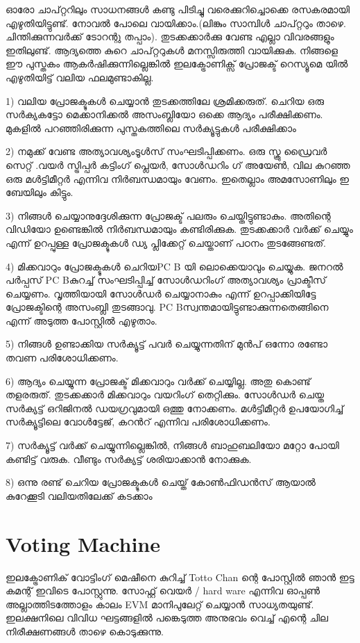 \documentclass[10pt,a4paper]{report}
\begin{document}
      ഓരോ ചാപ്റ്ററിലും സാധനങ്ങൾ കണ്ടു പിടിച്ചു വരെക്കുറിച്ചൊക്കെ രസകരമായി എഴുതിയിട്ടുണ്ട്. നോവൽ പോലെ വായിക്കാം.(ലിങ്കും സാമ്പിൾ ചാപ്റ്ററും താഴെ. ചിന്തിക്കുന്നവർക്ക് ടോറന്റു തപ്പാം). തുടക്കക്കാർക്കു വേണ്ട എല്ലാ വിവരങ്ങളും ഇതിലുണ്ട്. ആദ്യത്തെ കുറെ ചാപ്റ്ററുകൾ മനസ്സിരുത്തി വായിക്കുക. നിങ്ങളെ ഈ പുസ്തകം ആകർഷിക്കുന്നില്ലെങ്കിൽ ഇലക്ട്രോണിക്സ് പ്രോജക്ട് റെസ്യൂമെ യിൽ എഴുതിയിട്ട് വലിയ ഫലമുണ്ടാകില്ല.
      
       1) വലിയ പ്രോജക്ടുകൾ ചെയ്യാൻ തുടക്കത്തിലേ ശ്രമിക്കരുത്. ചെറിയ ഒരു സർക്യകട്ടോ മെക്കാനിക്കൽ അസംബ്ലിയോ ഒക്കെ ആദ്യം പരീക്ഷിക്കണം. മുകളിൽ പറഞ്ഞിരിക്കുന്ന പുസ്തകത്തിലെ സർക്യൂട്ടുകൾ പരീക്ഷിക്കാം 
       
       2) നമുക്ക് വേണ്ട അത്യാവശ്യംടൂൾസ് സംഘടിപ്പിക്കണം. ഒരു സ്ക്രു ഡ്രൈവർ സെറ്റ് .വയർ സ്ട്രിപ്പർ കട്ടിംഗ് പ്ലെയർ, സോൾഡറിം ഗ് അയേൺ, വില കുറഞ്ഞ ഒരു മൾട്ടിമീറ്റർ എന്നിവ നിർബന്ധമായും വേണം. ഇതെല്ലാം അമസോണിലും ഇ ബേയിലും കിട്ടും. 
       
       3) നിങ്ങൾ ചെയ്യാനുദ്ദേശിക്കുന്ന പ്രോജക്ട് പലരും ചെയ്തിട്ടുണ്ടാകും. അതിന്റെ വിഡിയോ ഉണ്ടെങ്കിൽ നിർബന്ധമായും കണ്ടിരിക്കുക. തുടക്കക്കാർ വർക്ക് ചെയ്യും എന്ന് ഉറപ്പുള്ള പ്രോജക്ടുകൾ ഡ്യ പ്ലിക്കേറ്റ് ചെയ്താണ് പഠനം തുടങ്ങേണ്ടത്. 
       
       4) മിക്കവാറും പ്രോജക്ടുകൾ ചെറിയPC B യി ലൊക്കെയാവും ചെയ്യുക. ജനറൽ പർപ്പസ് PC Bകുറച്ച് സംഘടിപ്പിച്ച് സോൾഡറിംഗ് അത്യാവശ്യം പ്രാക്ടീസ് ചെയ്യണം. വൃത്തിയായി സോൾഡർ ചെയ്യാനാകും എന്ന് ഉറപ്പാക്കിയിട്ടേ പ്രോജക്ടിന്റെ അസംബ്ലി തുടങ്ങാവു. PC Bസ്വന്തമായിട്ടുണ്ടാക്കുന്നതെങ്ങിനെ എന്ന് അടുത്ത പോസ്റ്റിൽ എഴുതാം.
       
        5) നിങ്ങൾ ഉണ്ടാക്കിയ സർക്യൂട്ട് പവർ ചെയ്യുന്നതിന് മുൻപ് ഒന്നോ രണ്ടോ തവണ പരിശോധിക്കണം. 
        
        6) ആദ്യം ചെയ്യുന്ന പ്രോജക്ട് മിക്കവാറും വർക്ക് ചെയ്യില്ല. അതു കൊണ്ട് തളരരുത്. തുടക്കക്കാർ മിക്കവാറും വയറിംഗ് തെറ്റിക്കും. സോൾഡർ ചെയ്ത സർക്യട്ട് ഒറിജിനൽ ഡയഗ്രവുമായി ഒത്തു നോക്കണം. മൾട്ടിമീറ്റർ ഉപയോഗിച്ച് സർക്യൂട്ടിലെ വോൾട്ടേജ്, കറൻറ് എന്നിവ പരിശോധിക്കണം. 
        
        7) സർക്യൂട്ട് വർക്ക് ചെയ്യുന്നില്ലെങ്കിൽ, നിങ്ങൾ ബാഹുബലിയോ മറ്റോ പോയി കണ്ടിട്ട് വരുക. വീണ്ടും സർക്യട്ട് ശരിയാക്കാൻ നോക്കുക. 
        
        8) ഒന്നു രണ്ട് ചെറിയ പ്രോജക്ടുകൾ ചെയ്ത് കോൺഫിഡൻസ് ആയാൽ കുറേക്കൂടി വലിയതിലേക്ക് കടക്കാം
    
   
    
    \section{Voting Machine}
    ഇലക്ട്രോണിക് വോട്ടിംഗ് മെഷീനെ കുറിച്ച് Totto Chan ന്റെ പോസ്റ്റിൽ ഞാൻ ഇട്ട കമന്റ് ഇവിടെ പോസ്റ്റുന്നു. സോഫ്റ്റ് വെയർ / hard ware എന്നിവ ഓപ്പൺ അല്ലാത്തിടത്തോളം കാലം EVM മാനിപുലേറ്റ് ചെയ്യാൻ സാധ്യതയുണ്ട്. ഇലക്ഷനിലെ വിവിധ ഘട്ടങ്ങളിൽ പങ്കെടുത്ത അനുഭവം വെച്ച് എന്റെ ചില നിരീക്ഷണങ്ങൾ താഴെ കൊടുക്കുന്നു.
    
\end{document}
